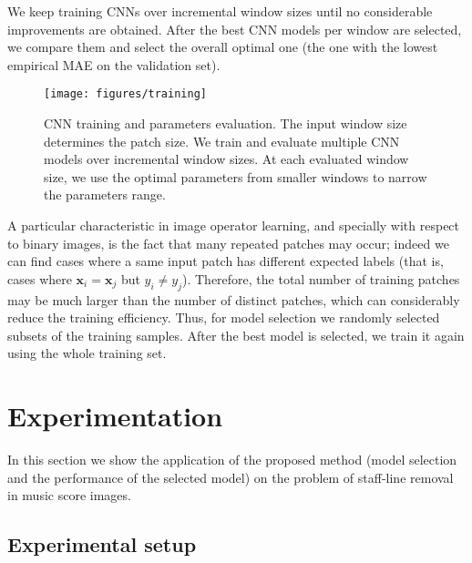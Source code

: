 \documentclass[conference]{IEEEtran}
\begin{document}
We keep training CNNs over incremental window sizes until no
considerable improvements are obtained. After the best CNN models per
window are selected, we compare them and select the overall optimal
one (the one with the lowest empirical MAE on the validation set).

\begin{figure*}[htb]
\centering
\texttt{[image: figures/training]}
\caption{CNN training and parameters evaluation. The input window size
  determines the patch size. We train and evaluate multiple CNN models
  over incremental window sizes. At each evaluated window size, we use
  the optimal parameters from smaller windows to narrow the parameters
  range.}
\label{fig:training} 
\end{figure*}

A particular characteristic in image operator learning, and specially
with respect to binary images, is the fact that many repeated patches
may occur; indeed we can find cases where a same input patch has
different expected labels (that is, cases where $\mathbf{x}_i =
\mathbf{x}_j$ but $y_i \neq y_j$). Therefore, the total number of
training patches may be much larger than the number of distinct
patches, which can considerably reduce the training efficiency.
Thus, for model selection we randomly selected subsets of the
training samples. After the best model is selected, we train it again  
using the whole training set.


\section{Experimentation}
\label{sec:experiments}

In this section we show the application of the proposed method (model
selection and the performance of the selected model) on the problem of
staff-line removal in music score images.

\subsection{Experimental setup}
\end{document}
